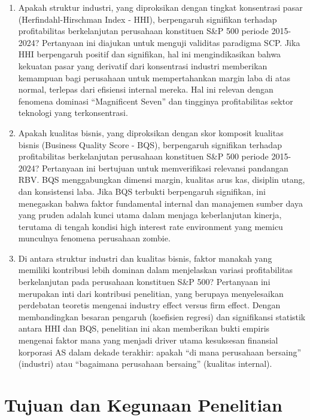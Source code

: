 \documentclass[12pt,a4paper]{report}
\providecommand{\tightlist}{%
  \setlength{\itemsep}{0pt}\setlength{\parskip}{0pt}%
}
\begin{document}
\begin{enumerate}
\def\labelenumi{\arabic{enumi}.}
\tightlist
\item
  Apakah struktur industri, yang diproksikan dengan tingkat konsentrasi
  pasar (Herfindahl-Hirschman Index - HHI), berpengaruh signifikan
  terhadap profitabilitas berkelanjutan perusahaan konstituen S\&P 500
  periode 2015-2024? Pertanyaan ini diajukan untuk menguji validitas
  paradigma SCP. Jika HHI berpengaruh positif dan signifikan, hal ini
  mengindikasikan bahwa kekuatan pasar yang derivatif dari konsentrasi
  industri memberikan kemampuan bagi perusahaan untuk mempertahankan
  margin laba di atas normal, terlepas dari efisiensi internal mereka.
  Hal ini relevan dengan fenomena dominasi ``Magnificent Seven'' dan
  tingginya profitabilitas sektor teknologi yang terkonsentrasi.
\item
  Apakah kualitas bisnis, yang diproksikan dengan skor komposit kualitas
  bisnis (Business Quality Score - BQS), berpengaruh signifikan terhadap
  profitabilitas berkelanjutan perusahaan konstituen S\&P 500 periode
  2015-2024? Pertanyaan ini bertujuan untuk memverifikasi relevansi
  pandangan RBV. BQS menggabungkan dimensi margin, kualitas arus kas,
  disiplin utang, dan konsistensi laba. Jika BQS terbukti berpengaruh
  signifikan, ini menegaskan bahwa faktor fundamental internal dan
  manajemen sumber daya yang pruden adalah kunci utama dalam menjaga
  keberlanjutan kinerja, terutama di tengah kondisi high interest rate
  environment yang memicu munculnya fenomena perusahaan zombie.
\item
  Di antara struktur industri dan kualitas bisnis, faktor manakah yang
  memiliki kontribusi lebih dominan dalam menjelaskan variasi
  profitabilitas berkelanjutan pada perusahaan konstituen S\&P 500?
  Pertanyaan ini merupakan inti dari kontribusi penelitian, yang
  berupaya menyelesaikan perdebatan teoretis mengenai industry effect
  versus firm effect. Dengan membandingkan besaran pengaruh (koefisien
  regresi) dan signifikansi statistik antara HHI dan BQS, penelitian ini
  akan memberikan bukti empiris mengenai faktor mana yang menjadi driver
  utama kesuksesan finansial korporasi AS dalam dekade terakhir: apakah
  ``di mana perusahaan bersaing'' (industri) atau ``bagaimana perusahaan
  bersaing'' (kualitas internal).
\end{enumerate}

\hypertarget{tujuan-dan-kegunaan-penelitian}{%
\section{Tujuan dan Kegunaan
Penelitian}\label{tujuan-dan-kegunaan-penelitian}}
\end{document}
